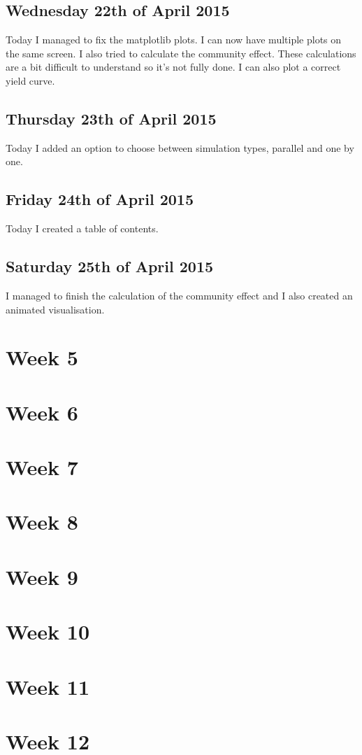 \documentclass{article}
\begin{document}
\subsection{Wednesday 22th of April 2015}
Today I managed to fix the matplotlib plots. I can now have multiple plots on the same screen. I also tried to calculate the community effect. These calculations are a bit difficult to understand so it's not fully done. I can also plot a correct yield curve.

\subsection{Thursday 23th of April 2015}
Today I added an option to choose between simulation types, parallel and one by one.

\subsection{Friday 24th of April 2015}
Today I created a table of contents.

\subsection{Saturday 25th of April 2015}
I managed to finish the calculation of the community effect and I also created an animated visualisation.

\section{Week 5}


\section{Week 6}


\section{Week 7}


\section{Week 8}


\section{Week 9}


\section{Week 10}


\section{Week 11}


\section{Week 12}




\end{document}
